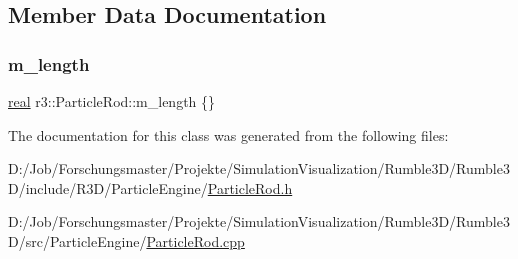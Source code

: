 \subsection{Member Data Documentation}
\mbox{\label{classr3_1_1_particle_rod_af146e442c0ddcb83161f115da58fa026}} 
\subsubsection{\texorpdfstring{m\+\_\+length}{m\_length}}
{\footnotesize\ttfamily \mbox{\hyperlink{namespacer3_ab2016b3e3f743fb735afce242f0dc1eb}{real}} r3\+::\+Particle\+Rod\+::m\+\_\+length \{\}\hspace{0.3cm}{\ttfamily [protected]}}



The documentation for this class was generated from the following files\+:\begin{DoxyCompactItemize}
\item 
D\+:/\+Job/\+Forschungsmaster/\+Projekte/\+Simulation\+Visualization/\+Rumble3\+D/\+Rumble3\+D/include/\+R3\+D/\+Particle\+Engine/\mbox{\hyperlink{_particle_rod_8h}{Particle\+Rod.\+h}}\item 
D\+:/\+Job/\+Forschungsmaster/\+Projekte/\+Simulation\+Visualization/\+Rumble3\+D/\+Rumble3\+D/src/\+Particle\+Engine/\mbox{\hyperlink{_particle_rod_8cpp}{Particle\+Rod.\+cpp}}\end{DoxyCompactItemize}
